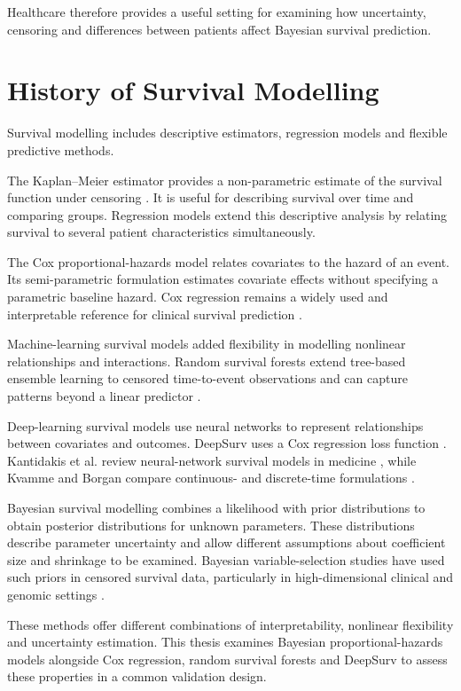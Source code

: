 Healthcare therefore provides a useful setting for examining how uncertainty, censoring and differences between patients affect Bayesian survival prediction.

\section{History of Survival Modelling}\label{history-of-survival-modelling}

Survival modelling includes descriptive estimators, regression models and flexible predictive methods.

The Kaplan--Meier estimator provides a non-parametric estimate of the survival function under censoring \cite{kaplan1958}. It is useful for describing survival over time and comparing groups. Regression models extend this descriptive analysis by relating survival to several patient characteristics simultaneously.

The Cox proportional-hazards model relates covariates to the hazard of an event. Its semi-parametric formulation estimates covariate effects without specifying a parametric baseline hazard. Cox regression remains a widely used and interpretable reference for clinical survival prediction \cite{ref14,cox1972}.

Machine-learning survival models added flexibility in modelling nonlinear relationships and interactions. Random survival forests extend tree-based ensemble learning to censored time-to-event observations and can capture patterns beyond a linear predictor \cite{ref3,ishwaran2008}.

Deep-learning survival models use neural networks to represent relationships between covariates and outcomes. DeepSurv uses a Cox regression loss function \cite{ref4}. Kantidakis et al. review neural-network survival models in medicine \cite{ref5}, while Kvamme and Borgan compare continuous- and discrete-time formulations \cite{ref21}.

Bayesian survival modelling combines a likelihood with prior distributions to obtain posterior distributions for unknown parameters. These distributions describe parameter uncertainty and allow different assumptions about coefficient size and shrinkage to be examined. Bayesian variable-selection studies have used such priors in censored survival data, particularly in high-dimensional clinical and genomic settings \cite{ref6}.

These methods offer different combinations of interpretability, nonlinear flexibility and uncertainty estimation. This thesis examines Bayesian proportional-hazards models alongside Cox regression, random survival forests and DeepSurv to assess these properties in a common validation design.

